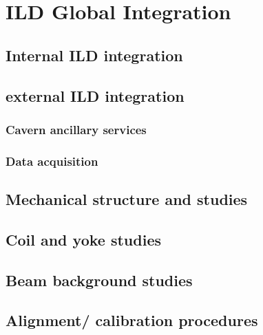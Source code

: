 \chapter{ILD Global Integration}

\section{Internal ILD integration}

\section{external ILD integration}

\subsection{Cavern ancillary services}

\subsection{Data acquisition}

\section{Mechanical structure and studies}

\section{Coil and yoke studies}

\section{Beam background studies}

\section{Alignment/ calibration procedures}
